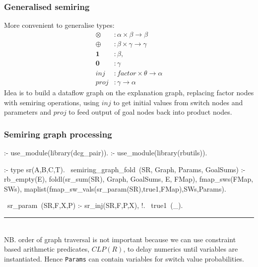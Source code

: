 \documentclass[usenames,dvipsnames]{beamer}
\newenvironment{isframe}[1][untitled]{\begin{frame}[fragile=singleslide,environment=isframe]\frametitle{#1}}{\end{frame}}
\def\pl#1{\lstinline[language={[SWI]Prolog},columns=fullflexible]{#1}}
\begin{document}
\begin{isframe}[Generalised semiring]
More convenient to generalise types:
\begin{align*}
  \otimes &: \alpha \times \beta \to \beta \\
  \oplus &: \beta \times \gamma \to \gamma \\
  \mathbf{1} &: \beta,\\
  \mathbf{0} &: \gamma\\
  \mathit{inj} &: \mathit{factor} \times \theta \to \alpha\\
  \mathit{proj} &: \gamma \to \alpha
\end{align*}
Idea is to build a dataflow graph on the explanation graph, replacing
factor nodes with semiring operations, using $\mathit{inj}$ to get initial
values from switch nodes and parameters and $\mathit{proj}$ to feed output of goal nodes
back into product nodes.
\end{isframe}

\begin{isframe}[Semiring graph processing]
\begin{prolog}[xleftmargin=0em,basicstyle=\small]
  :- use_module(library(dcg_pair)).
  :- use_module(library(rbutils)).

  :- type sr(A,B,C,T). %
  ~semiring_graph_fold~(SR, Graph, Params, GoalSums) :-
     rb_empty(E),
     foldl(sr_sum(SR), Graph, GoalSums, E, FMap),
     fmap_sws(FMap, SWs),
     maplist(fmap_sw_vals(sr_param(SR),true1,FMap),SWs,Params).

  ~sr_param~(SR,F,X,P) :- sr_inj(SR,F,P,X), !.
  ~true1~(_).
\end{prolog}
\vspace{-1.5em}
\rule{\linewidth}{0.4pt}\\
NB. order of graph traversal is not important because we can use constraint based arithmetic
predicates, \eg $\mathit{CLP}(R)$, to delay numerics until variables are instantiated. Hence
\pl{Params} can contain variables for switch value probabilities.
\end{isframe}
\end{document}
